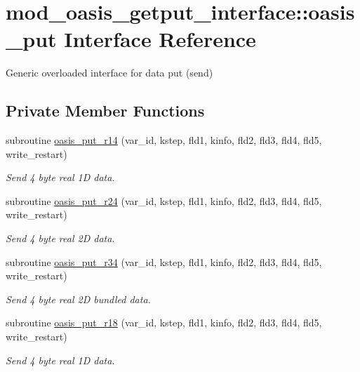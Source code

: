 \hypertarget{interfacemod__oasis__getput__interface_1_1oasis__put}{}\section{mod\+\_\+oasis\+\_\+getput\+\_\+interface\+:\+:oasis\+\_\+put Interface Reference}
\label{interfacemod__oasis__getput__interface_1_1oasis__put}


Generic overloaded interface for data put (send)  


\subsection*{Private Member Functions}
\begin{DoxyCompactItemize}
\item 
subroutine \hyperlink{interfacemod__oasis__getput__interface_1_1oasis__put_a5daa7fd6bfab2e09ba23d815d6120da1}{oasis\+\_\+put\+\_\+r14} (var\+\_\+id, kstep, fld1, kinfo, fld2, fld3, fld4, fld5, write\+\_\+restart)
\begin{DoxyCompactList}\small\item\em Send 4 byte real 1D data. \end{DoxyCompactList}\item 
subroutine \hyperlink{interfacemod__oasis__getput__interface_1_1oasis__put_a0d2dc5120c55ca753bc5e6a1a22c0890}{oasis\+\_\+put\+\_\+r24} (var\+\_\+id, kstep, fld1, kinfo, fld2, fld3, fld4, fld5, write\+\_\+restart)
\begin{DoxyCompactList}\small\item\em Send 4 byte real 2D data. \end{DoxyCompactList}\item 
subroutine \hyperlink{interfacemod__oasis__getput__interface_1_1oasis__put_a58fd29713950ff380f847bbb88cdca2b}{oasis\+\_\+put\+\_\+r34} (var\+\_\+id, kstep, fld1, kinfo, fld2, fld3, fld4, fld5, write\+\_\+restart)
\begin{DoxyCompactList}\small\item\em Send 4 byte real 2D bundled data. \end{DoxyCompactList}\item 
subroutine \hyperlink{interfacemod__oasis__getput__interface_1_1oasis__put_a1c434d693016ff43967eff96ee313dda}{oasis\+\_\+put\+\_\+r18} (var\+\_\+id, kstep, fld1, kinfo, fld2, fld3, fld4, fld5, write\+\_\+restart)
\begin{DoxyCompactList}\small\item\em Send 4 byte real 1D data. \end{DoxyCompactList}\item 

\end{DoxyCompactItemize}
